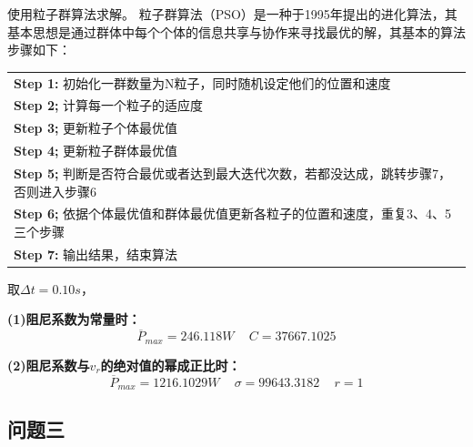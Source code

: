 \documentclass{my_paper}
\begin{document}
使用粒子群算法求解。
粒子群算法（PSO）是一种于1995年提出的进化算法，其基本思想是通过群体中每个个体的信息共享与协作来寻找最优的解，其基本的算法步骤如下：\\

\begin{tabular}{l}
   
   \toprule
    \toprule
    
    \textbf{Step 1:}  初始化一群数量为N粒子，同时随机设定他们的位置和速度 \\
  
    \textbf{Step 2;}  计算每一个粒子的适应度\\
  
    \textbf{Step 3;}  更新粒子个体最优值\\
  
    \textbf{Step 4;}  更新粒子群体最优值\\
  
    \textbf{Step 5;}  判断是否符合最优或者达到最大迭代次数，若都没达成，跳转步骤7，否则进入步骤6\\
  
    \textbf{Step 6;} 依据个体最优值和群体最优值更新各粒子的位置和速度，重复3、4、5三个步骤\\
  
    \textbf{Step 7:} 输出结果，结束算法
  \\
    \midrule
  \end{tabular}
 

取$\Delta t = 0.10s$，

\noindent\textbf{(1)阻尼系数为常量时：}
\begin{equation}
    \overline{P}_{max}=246.118W\, \quad C=37667.1025  
\end{equation}

\noindent\textbf{(2)阻尼系数与$v_r$的绝对值的幂成正比时：}
\begin{equation}
    \overline{P}_{max}=1216.1029W\, \quad \sigma=99643.3182\, \quad r=1  
\end{equation}


\subsection{问题三}
\end{document}
